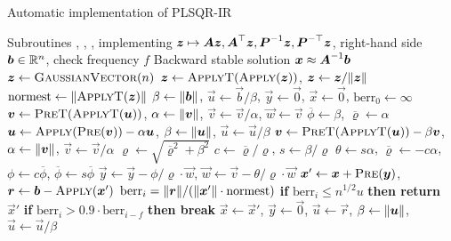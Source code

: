 \documentclass[onefignum,onetabnum,pagebackref,dvipsnames]{siamart220329}
\begin{document}
\begin{algorithm}[t]
	\caption{Automatic implementation of PLSQR-IR} \label{alg:lsqr-ir}
	\begin{algorithmic}[1]
		\Require Subroutines , , ,  implementing $\boldsymbol{z} \mapsto \boldsymbol{A}\boldsymbol{z},\boldsymbol{A}^\top\boldsymbol{z},\boldsymbol{P}^{-1}\boldsymbol{z},\boldsymbol{P}^{-\top}\boldsymbol{z}$, right-hand side $\boldsymbol{b} \in \mathbb{R}^n$, check frequency $f$
		\Ensure Backward stable solution $\boldsymbol{x} \approx \boldsymbol{A}^{-1}\boldsymbol{b}$
		\State $\vec{z} \gets \Call{GaussianVector}{n}$ 
        \State $\vec{z} \gets \Call{ApplyT}{\textsc{Apply}(\vec{z})}$, $\vec{z} \gets \vec{z} / \norm{\vec{z}}$ 
        \EndFor
        \State $\mathrm{normest} \gets \norm{\Call{ApplyT}{\vec{z}}}$ 
        \State $\beta \gets \norm{\vec{b}}$, $\vec{u} \gets \vec{b} / \beta$, $\vec{y} \gets \vec{0}$, $\vec{x}\gets \vec{0}$, $\mathrm{berr}_0 \gets \infty$ 
         
        \State $\vec{v} \gets \Call{PreT}{\textsc{ApplyT}(\vec{u})}$, $\alpha \gets \norm{\vec{v}}$, $\vec{v} \gets \vec{v} / \alpha$, $\vec{w} \gets \vec{v}$ 
        \State $\overline{\phi} \gets \beta$, $\overline{\varrho} \gets \alpha$
        \State $\vec{u}\gets \Call{Apply}{\textsc{Pre}(\vec{v})} - \alpha \vec{u}$, $\beta \gets \norm{\vec{u}}$, $\vec{u} \gets \vec{u}/\beta$ 
        \State $\vec{v} \gets \Call{PreT}{\textsc{ApplyT}(\vec{u})}-\beta \vec{v}$, $\alpha \gets \norm{\vec{v}}$, $\vec{v} \gets \vec{v} / \alpha$ 
        \State $\varrho \gets \sqrt{\overline{\varrho}^2 + \beta^2}$
        \State $c \gets \overline{\varrho} / \varrho$, $s \gets \beta / \varrho$
        \State $\theta \gets s \alpha$, $\overline{\varrho} \gets -c\alpha$, $\phi\gets c\overline{\phi}$, $\overline{\phi}\gets s\overline{\phi}$
        \State $\vec{y} \gets \vec{y} - \phi/\varrho\cdot \vec{w}$, $\vec{w} \gets \vec{v} - \theta/\varrho\cdot \vec{w}$ 
         
        \State $\vec{x}' \gets \vec{x}+\Call{Pre}{\vec{y}}$, $\vec{r} \gets \vec{b} - \Call{Apply}{\vec{x}'}$ 
        \State $\mathrm{berr}_i = \norm{\vec{r}} / (\norm{\vec{x}'} \cdot \mathrm{normest})$ 
        \State \textbf{if} $\mathrm{berr}_i \le n^{1/2}u$ \textbf{then return} $\vec{x}'$ 
        \State \textbf{if} $\mathrm{berr}_i > 0.9\cdot \mathrm{berr}_{i-f}$ \textbf{then break} 
        \EndIf
        \EndFor
        \State $\vec{x} \gets \vec{x}'$, $\vec{y} \gets \vec{0}$, $\vec{u} \gets \vec{r}$, $\beta \gets \norm{\vec{u}}$, $\vec{u} \gets \vec{u} /\beta$ 
        \EndWhile
	\end{algorithmic}
\end{algorithm}
\end{document}
